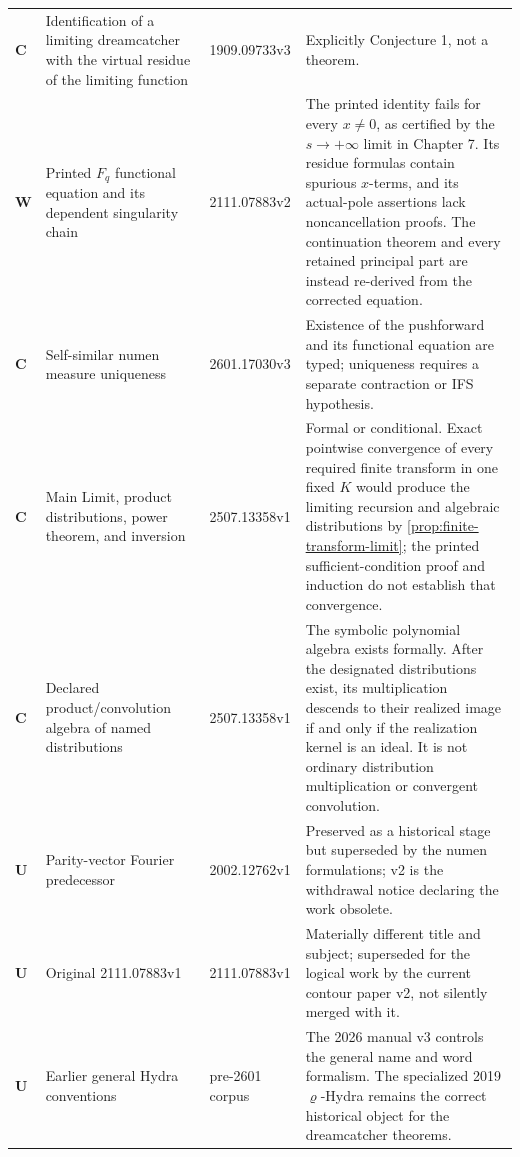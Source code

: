 \begin{longtable}{@{}p{}p{}p{}p{}@{}}
\textbf{C} & Identification of a limiting dreamcatcher with the virtual
residue of the limiting function & 1909.09733v3 & Explicitly Conjecture 1,
not a theorem.\\

\textbf{W} & Printed $F_q$ functional equation and its dependent
singularity chain & 2111.07883v2 & The printed identity fails for every
$x\ne0$, as certified by the $s\to+\infty$ limit in Chapter 7.  Its
residue formulas contain spurious $x$-terms, and its actual-pole assertions
lack noncancellation proofs.  The continuation theorem and every retained
principal part are instead re-derived from the corrected equation.\\

\textbf{C} & Self-similar numen measure uniqueness & 2601.17030v3 &
Existence of the pushforward and its functional equation are
typed; uniqueness requires a separate contraction or IFS hypothesis.\\

\textbf{C} & Main Limit, product distributions, power theorem, and inversion
& 2507.13358v1 & Formal or conditional.  Exact pointwise convergence of every
required finite transform in one fixed $K$ would produce the limiting
recursion and algebraic distributions by
\cref{prop:finite-transform-limit}; the printed sufficient-condition proof
and induction do not establish that convergence.\\

\textbf{C} & Declared product/convolution algebra of named distributions &
2507.13358v1 & The symbolic polynomial algebra exists formally.  After the
designated distributions exist, its multiplication descends to their realized
image if and only if the realization kernel is an ideal.  It is not ordinary
distribution multiplication or convergent convolution.\\

\textbf{U} & Parity-vector Fourier predecessor & 2002.12762v1 & Preserved as
a historical stage but superseded by the numen formulations; v2 is the
withdrawal notice declaring the work obsolete.\\

\textbf{U} & Original 2111.07883v1 & 2111.07883v1 & Materially different
title and subject; superseded for the logical work by the current contour
paper v2, not silently merged with it.\\

\textbf{U} & Earlier general Hydra conventions & pre-2601 corpus & The 2026
manual v3 controls the general name and word formalism.  The specialized
2019 $\varrho$-Hydra remains the correct historical object for the
dreamcatcher theorems.\\


\end{longtable}
